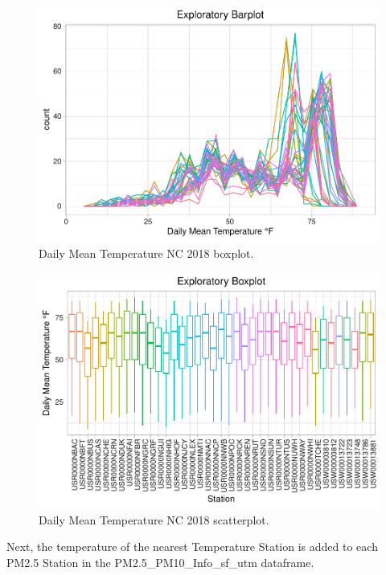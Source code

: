 \documentclass[12pt,]{article}
\begin{document}
\begin{figure}
\centering
\includegraphics{./Outputunnamed-chunk-30-1.pdf}
\caption{Daily Mean Temperature NC 2018 boxplot. \label{Temp_boxplot}}
\end{figure}

\begin{figure}
\centering
\includegraphics{./Outputunnamed-chunk-31-1.pdf}
\caption{Daily Mean Temperature NC 2018 scatterplot.
\label{Temp_scatterplot}}
\end{figure}

Next, the temperature of the nearest Temperature Station is added to
each PM2.5 Station in the PM2.5\_PM10\_Info\_sf\_utm dataframe.
\end{document}
